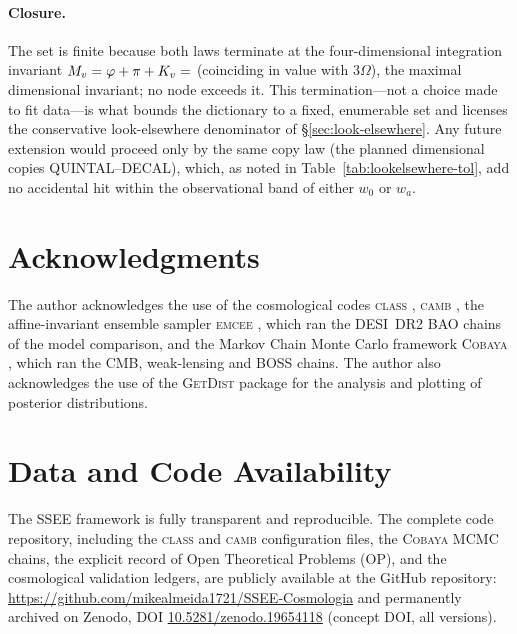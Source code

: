\documentclass[a4paper,11pt]{article}
\begin{document}
\paragraph{Closure.} The set is finite because both laws terminate at the
four-dimensional integration invariant $M_v=\varphi+\pi+K_v=\val{M_V_d6}$ (coinciding in value with $3\Omega$), the
maximal dimensional invariant; no node exceeds it. This termination---not a
choice made to fit data---is what bounds the dictionary to a fixed, enumerable
set and licenses the conservative look-elsewhere denominator of
\S\ref{sec:look-elsewhere}. Any future extension would proceed only by the same
copy law (the planned dimensional copies QUINTAL--DECAL), which, as noted in
Table~\ref{tab:lookelsewhere-tol}, add no accidental hit within the
observational band of either $w_0$ or $w_a$.

\section*{Acknowledgments}
The author acknowledges the use of the cosmological codes \textsc{class} \citep{Blas2011}, \textsc{camb} \citep{Lewis2000}, the affine-invariant ensemble sampler \textsc{emcee} \citep{emcee}, which ran the DESI~DR2 BAO chains of the model comparison, and the Markov Chain Monte Carlo framework \textsc{Cobaya} \citep{Torrado2021}, which ran the CMB, weak-lensing and BOSS chains. The author also acknowledges the use of the \textsc{GetDist} package \citep{Lewis2019} for the analysis and plotting of posterior distributions.

\section*{Data and Code Availability}
The SSEE framework is fully transparent and reproducible. The complete code repository, including the \textsc{class} and \textsc{camb} configuration files, the \textsc{Cobaya} MCMC chains, the explicit record of Open Theoretical Problems (OP), and the cosmological validation ledgers, are publicly available at the GitHub repository: \url{https://github.com/mikealmeida1721/SSEE-Cosmologia} and permanently archived on Zenodo, DOI \href{https://doi.org/10.5281/zenodo.19654118}{10.5281/zenodo.19654118} (concept DOI, all versions).

\clearpage

\end{document}
